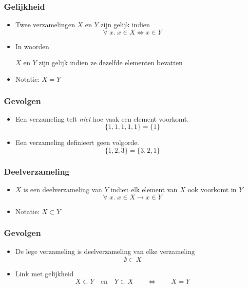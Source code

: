 \documentclass[dutch]{../khlslides}
\begin{document}
\begin{frame}
  \frametitle{Gelijkheid}
  \begin{itemize}
    \item Twee verzamelingen $X$ en $Y$ zijn gelijk indien
          \[ \forall \; x. \; x \in X \iff x \in Y \]
          \vskip5mm
    \item In woorden
          \begin{center}
            $X$ en $Y$ zijn gelijk indien ze dezelfde elementen bevatten
          \end{center}
          \vskip5mm
    \item Notatie: $X = Y$
  \end{itemize}
\end{frame}

\begin{frame}
  \frametitle{Gevolgen}
  \begin{itemize}
    \item Een verzameling telt \emph{niet} hoe vaak een element voorkomt.
          \[ \{ 1, 1, 1, 1, 1 \} = \{ 1 \} \]
    \item Een verzameling definieert geen volgorde.
          \[ \{ 1, 2, 3 \} = \{ 3, 2, 1 \} \]
  \end{itemize}
\end{frame}

\begin{frame}
  \frametitle{Deelverzameling}
  \begin{center}
  \end{center}
  \begin{itemize}
    \item $X$ is een deelverzameling van $Y$ indien elk element van $X$ ook voorkomt in $Y$
          \[
            \forall \; x. \; x \in X \rightarrow x \in Y
          \]
    \item Notatie: $X \subset Y$
  \end{itemize}
\end{frame}

\begin{frame}
  \frametitle{Gevolgen}
  \begin{itemize}
    \item De lege verzameling is deelverzameling van elke verzameling
          \[ \emptyset \subset X \]
          \vskip4mm
    \item Link met gelijkheid
          \[ X \subset Y \quad\textrm{en}\quad Y \subset X \qquad\iff\qquad X = Y \]
  \end{itemize}
\end{frame}
\end{document}
